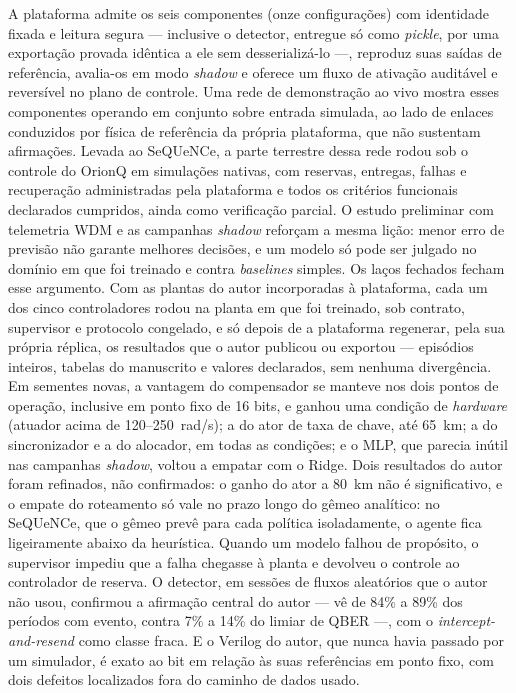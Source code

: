\documentclass[12pt]{article}
\begin{document}
A plataforma admite os seis componentes (onze configurações) com identidade
fixada e leitura segura --- inclusive o detector, entregue só como
\textit{pickle}, por uma exportação provada idêntica a ele sem desserializá-lo ---,
reproduz suas saídas de referência, avalia-os em modo
\textit{shadow} e oferece um fluxo de ativação auditável e reversível no plano de
controle. Uma rede de demonstração ao vivo mostra esses componentes operando em
conjunto sobre entrada simulada, ao lado de enlaces conduzidos por física de
referência da própria plataforma, que não sustentam afirmações. Levada ao
SeQUeNCe, a parte terrestre dessa rede rodou sob o controle do OrionQ em
simulações nativas, com reservas, entregas, falhas e recuperação administradas
pela plataforma e todos os critérios funcionais declarados cumpridos, ainda como
verificação parcial. O estudo
preliminar com telemetria WDM e as campanhas \textit{shadow} reforçam a mesma
lição: menor erro de previsão não garante melhores decisões, e um modelo só
pode ser julgado no domínio em que foi treinado e contra \textit{baselines}
simples. Os laços fechados fecham esse argumento. Com as plantas do autor
incorporadas à plataforma, cada um dos cinco controladores rodou na planta em que
foi treinado, sob contrato, supervisor e protocolo congelado, e só depois de a
plataforma regenerar, pela sua própria réplica, os resultados que o autor
publicou ou exportou --- episódios inteiros, tabelas do manuscrito e valores
declarados, sem nenhuma divergência. Em sementes novas, a vantagem do compensador
se manteve nos dois pontos de operação, inclusive em ponto fixo de 16 bits, e
ganhou uma condição de \textit{hardware} (atuador acima de 120--250~rad/s); a do
ator de taxa de chave, até 65~km; a do
sincronizador e a do alocador, em todas as condições; e o MLP, que parecia inútil
nas campanhas \textit{shadow}, voltou a empatar com o Ridge. Dois resultados do
autor foram refinados, não confirmados: o ganho do ator a 80~km não é
significativo, e o empate do roteamento só vale no prazo longo do gêmeo
analítico: no SeQUeNCe, que o gêmeo prevê para cada política isoladamente, o
agente fica ligeiramente abaixo da heurística. Quando um modelo
falhou de propósito, o supervisor impediu que a falha chegasse à planta e
devolveu o controle ao controlador de reserva. O detector, em sessões de fluxos
aleatórios que o autor não usou, confirmou a afirmação central do autor --- vê de
84\% a 89\% dos períodos com evento, contra 7\% a 14\% do limiar de QBER ---,
com o \textit{intercept-and-resend} como classe fraca. E o Verilog do autor,
que nunca havia passado por um simulador, é exato ao bit em relação às suas
referências em ponto fixo, com dois defeitos localizados fora do caminho de dados
usado.
\end{document}
